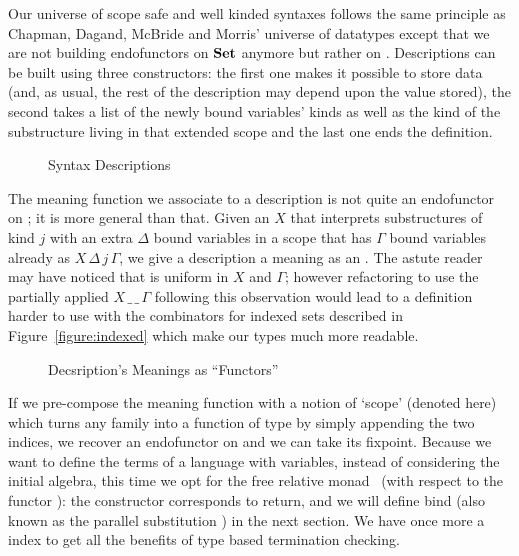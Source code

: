 Our universe of scope safe and well kinded syntaxes follows the same principle
as Chapman, Dagand, McBride and Morris' universe of datatypes except that we
are not building endofunctors on $\mathbf{Set}{}$ anymore but rather
on  . Descriptions can be built using three constructors:
the first one makes it possible to store data (and, as usual, the rest of
the description may depend upon the value stored), the second takes a list
of the newly bound variables' kinds as well as the kind of the substructure
living in that extended scope and the last one ends the definition.

\begin{figure}[h]
\caption{Syntax Descriptions}
\end{figure}

The meaning function  we associate to a description is not
quite an endofunctor on  ; it is more general than that.
Given an $X$ that interprets substructures of kind $j$ with an extra $Δ$ bound
variables in a scope that has $Γ$ bound variables already as $X\,Δ\,j\,Γ$,
we give a description a meaning as an  . The astute reader
may have noticed that  is uniform in $X$ and $Γ$; however
refactoring  to use the partially applied $X\,\_\,\_\,Γ$ following
this observation would lead to a definition harder to use with the
combinators for indexed sets described in Figure~\ref{figure:indexed}
which make our types much more readable.

\begin{figure}[h]
\caption{Decsription's Meanings as ``Functors''}
\end{figure}

If we pre-compose the meaning function  with a notion
of `scope' (denoted  here) which turns any  
family into a function of type     
by simply appending the two  indices, we recover an endofunctor on
  and we can take its fixpoint. Because we want to define
the terms of a language with variables, instead of considering the initial
algebra, this time we opt for the free relative
monad~\cite{JFR4389} (with respect to the functor ): the 
constructor corresponds to return, and we will define bind (also known as
the parallel substitution ) in the next section. We have once more
a  index to get all the benefits of type based termination checking.


